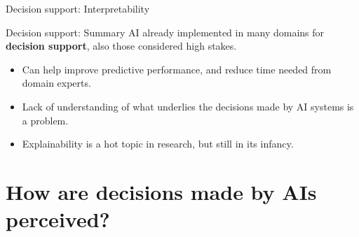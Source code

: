 \documentclass[8pt]{beamer}
\begin{document}
\begin{frame}{Decision support: Interpretability}
		\vfill
	\end{frame}

	\begin{frame}[t]{Decision support: Summary}
		AI already implemented in many domains for \textbf{decision support}, also those considered high stakes.
		\begin{itemize}
			\item Can help improve predictive performance, and reduce time needed from domain experts.
			\item Lack of understanding of what underlies the decisions made by AI systems is a problem.
			\item Explainability is a hot topic in research, but still in its infancy.
		\end{itemize}
	\end{frame}

	\section{How are decisions made by AIs perceived?}
\end{document}
